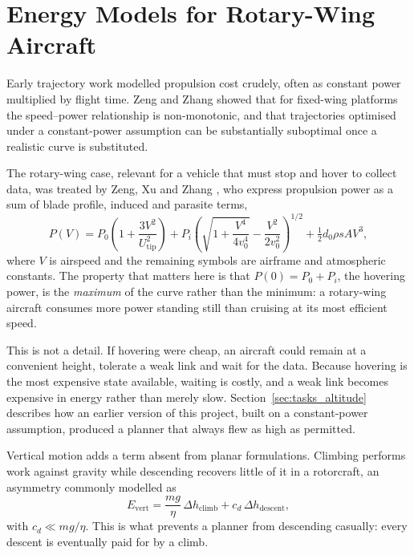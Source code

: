 \section{Energy Models for Rotary-Wing Aircraft}
\label{sec:lit_energy}

Early trajectory work modelled propulsion cost crudely, often as constant power multiplied by flight time. Zeng and Zhang \cite{zeng2017energy} showed that for fixed-wing platforms the speed--power relationship is non-monotonic, and that trajectories optimised under a constant-power assumption can be substantially suboptimal once a realistic curve is substituted.

The rotary-wing case, relevant for a vehicle that must stop and hover to collect data, was treated by Zeng, Xu and Zhang \cite{zeng2019rotary}, who express propulsion power as a sum of blade profile, induced and parasite terms,
\begin{equation}
P(V) = P_0\left(1 + \frac{3V^2}{U_{\mathrm{tip}}^2}\right) + P_i\left(\sqrt{1 + \frac{V^4}{4v_0^4}} - \frac{V^2}{2v_0^2}\right)^{\!1/2} + \tfrac{1}{2} d_0 \rho s A V^3 ,
\label{eq:pv}
\end{equation}
where $V$ is airspeed and the remaining symbols are airframe and atmospheric constants. The property that matters here is that $P(0) = P_0 + P_i$, the hovering power, is the \emph{maximum} of the curve rather than the minimum: a rotary-wing aircraft consumes more power standing still than cruising at its most efficient speed.

This is not a detail. If hovering were cheap, an aircraft could remain at a convenient height, tolerate a weak link and wait for the data. Because hovering is the most expensive state available, waiting is costly, and a weak link becomes expensive in energy rather than merely slow. Section~\ref{sec:tasks_altitude} describes how an earlier version of this project, built on a constant-power assumption, produced a planner that always flew as high as permitted.

Vertical motion adds a term absent from planar formulations. Climbing performs work against gravity while descending recovers little of it in a rotorcraft, an asymmetry commonly modelled as
\begin{equation}
E_{\mathrm{vert}} = \frac{mg}{\eta}\,\Delta h_{\mathrm{climb}} + c_d\,\Delta h_{\mathrm{descent}} ,
\label{eq:evert}
\end{equation}
with $c_d \ll mg/\eta$. This is what prevents a planner from descending casually: every descent is eventually paid for by a climb.

